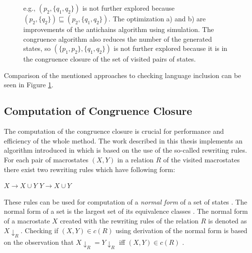 \begin{figure}[th]
\begin{center}
{{      e.g., $(p_2,\{q_1,q_2\})$ is not further explored because $(p_2,\{q_2\}) \sqsubseteq (p_2,\{q_1,q_2\})$. 
      The optimization a) and b) are improvements of the antichains algorithm using simulation. 
      The congruence algorithm also reduces the number of the generated states, so $(\{p_1,p_2\},\{q_1,q_2\})$ 
      is not further explored because it is in the congruence closure 
      of the set of visited pairs of states.}}
  \label{automata}
\end{center}
\end{figure}
Comparison of the mentioned approaches to checking language inclusion can be seen in Figure \ref{automata}.

\subsection{Computation of Congruence Closure}
\label{subsectionCongr}
The computation of the congruence closure is crucial for performance and efficiency of the whole method. The work described in this thesis implements
an algorithm introduced in \cite{popl13} which is based on the use of the so-called rewriting rules. For each pair of macrostates $(X,Y)$ in 
a relation $R$ of the visited macrostates there exist two rewriting rules which have following form:
\begin{center}
$X\rightarrow X\cup Y$ \hspace{5cm} $Y\rightarrow X\cup Y$
\end{center}

These rules can be used for computation of a \emph{normal form} of a set of states \cite{popl13}. The normal form of a set is the
largest set of its equivalence classes \cite{popl13}. The normal form of a macrostate $X$ created with
the rewriting rules of the relation $R$ is denoted as $X{\downarrow_R}$.
Checking if $(X,Y)\in c(R)$ using derivation of the normal form is based on the observation that $X{\downarrow_R}=Y{\downarrow_R}$ 
iff $(X,Y)\in c(R)$ \cite{popl13}.


